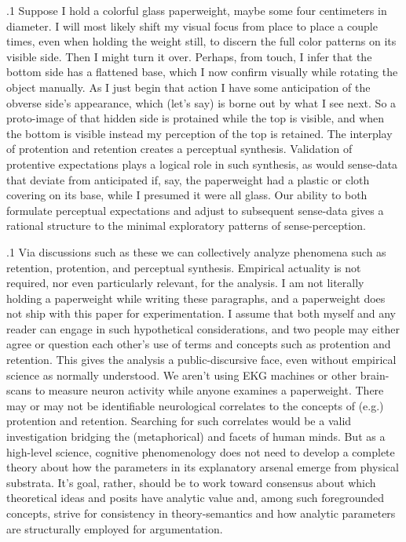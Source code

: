 \documentclass[11pt, twocolumn]{article}
\begin{document}
\p.1{%
Suppose I hold a colorful glass paperweight, maybe some
four centimeters in diameter.  I will most likely shift my
visual focus from place to place a couple times, even when holding the
weight still, to discern the full color patterns on its visible
side.  Then I might turn it over.  Perhaps, from touch, I infer that
the bottom side has a flattened base, which I now confirm visually
while rotating the object manually.  As I just begin that action I
have some anticipation of the obverse side's appearance, which (let's
say) is borne out by what I see next.  So a proto-image of that
hidden side is protained while the top is visible, and when the
bottom is visible instead my perception of the top is retained.
The interplay of protention and retention creates a
perceptual synthesis.  Validation of protentive expectations
plays a logical role in such synthesis, as would sense-data
that deviate from anticipated \mdash{} if, say, the paperweight
had a plastic or cloth covering on its base, while I
presumed it were all glass.  Our ability to both formulate
perceptual expectations and adjust to subsequent sense-data
gives a rational structure to the minimal exploratory
patterns of sense-perception.
} %

\p.1{%
Via discussions such as these we can collectively analyze
phenomena such as retention, protention, and perceptual
synthesis.  Empirical actuality
is not required, nor even particularly relevant, for the
analysis.  I am not literally holding a paperweight while
writing these paragraphs, and a paperweight does not
ship with this paper for experimentation.  I assume that
both myself and any reader can engage in such hypothetical
considerations, and two people may either agree or question
each other's use of terms and concepts such as
protention and retention.  This gives the analysis
a public-discursive face, even without empirical
science as normally understood.  We aren't using
EKG machines or other brain-scans to measure neuron activity
while anyone examines a paperweight.  There may or
may not be identifiable neurological correlates to the
concepts of (e.g.) protention and retention.
Searching for such correlates would be a valid investigation
bridging the (metaphorical)  and 
facets of human minds.  But as a high-level science,
cognitive phenomenology does not need to develop a
complete theory about how the parameters in its
explanatory arsenal emerge from physical substrata.
It's goal, rather, should be to work toward
consensus about which theoretical ideas and
posits have analytic value and, among such
foregrounded concepts, strive for consistency
in theory-semantics and how analytic parameters are
structurally employed for argumentation.
} %
\end{document}
